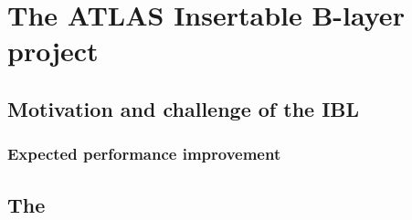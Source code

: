 \section{The ATLAS Insertable B-layer project}\label{sec:IBL}
\subsection{Motivation and challenge of the IBL}
\subsubsection{Expected performance improvement}
\subsection{The}
